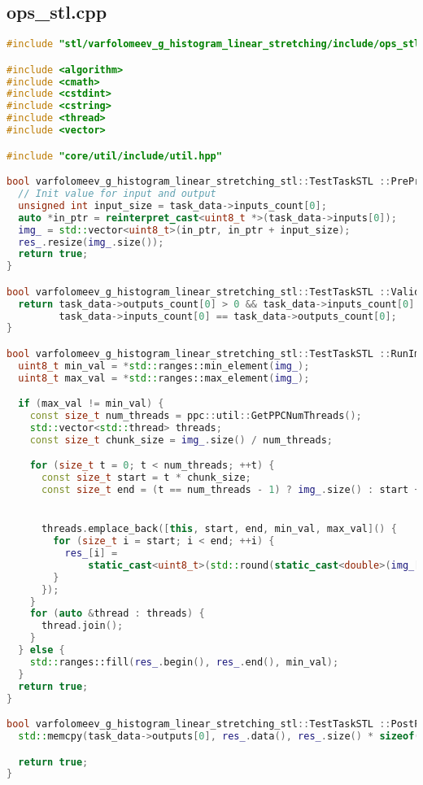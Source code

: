 \documentclass[a4paper,12pt]{article}
\begin{document}
\subsection{ops\_stl.cpp}
\begin{lstlisting}[language=C++,
    breaklines=true,       % Автоматический перенос строк
    basicstyle=\small\ttfamily, % Уменьшенный шрифт
    columns=fullflexible ]
    #include "stl/varfolomeev_g_histogram_linear_stretching/include/ops_stl.hpp"

#include <algorithm>
#include <cmath>
#include <cstdint>
#include <cstring>
#include <thread>
#include <vector>

#include "core/util/include/util.hpp"

bool varfolomeev_g_histogram_linear_stretching_stl::TestTaskSTL ::PreProcessingImpl() {
  // Init value for input and output
  unsigned int input_size = task_data->inputs_count[0];
  auto *in_ptr = reinterpret_cast<uint8_t *>(task_data->inputs[0]);
  img_ = std::vector<uint8_t>(in_ptr, in_ptr + input_size);
  res_.resize(img_.size());
  return true;
}

bool varfolomeev_g_histogram_linear_stretching_stl::TestTaskSTL ::ValidationImpl() {
  return task_data->outputs_count[0] > 0 && task_data->inputs_count[0] > 0 &&
         task_data->inputs_count[0] == task_data->outputs_count[0];
}

bool varfolomeev_g_histogram_linear_stretching_stl::TestTaskSTL ::RunImpl() {
  uint8_t min_val = *std::ranges::min_element(img_);
  uint8_t max_val = *std::ranges::max_element(img_);

  if (max_val != min_val) {
    const size_t num_threads = ppc::util::GetPPCNumThreads();
    std::vector<std::thread> threads;
    const size_t chunk_size = img_.size() / num_threads;

    for (size_t t = 0; t < num_threads; ++t) {
      const size_t start = t * chunk_size;
      const size_t end = (t == num_threads - 1) ? img_.size() : start + chunk_size;


      threads.emplace_back([this, start, end, min_val, max_val]() {
        for (size_t i = start; i < end; ++i) {
          res_[i] =
              static_cast<uint8_t>(std::round(static_cast<double>(img_[i] - min_val) * 255 / (max_val - min_val)));
        }
      });
    }
    for (auto &thread : threads) {
      thread.join();
    }
  } else {
    std::ranges::fill(res_.begin(), res_.end(), min_val);
  }
  return true;
}

bool varfolomeev_g_histogram_linear_stretching_stl::TestTaskSTL ::PostProcessingImpl() {
  std::memcpy(task_data->outputs[0], res_.data(), res_.size() * sizeof(uint8_t));

  return true;
}
    \end{lstlisting}
\end{document}
